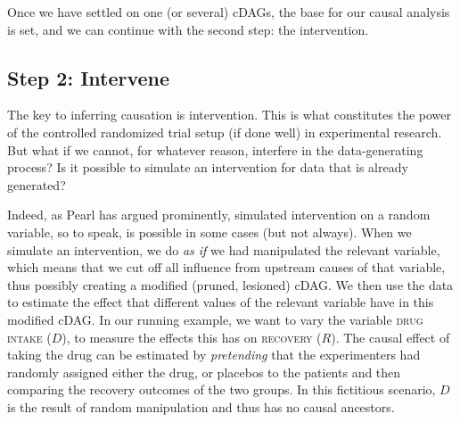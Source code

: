 \documentclass[nobib]{tufte-handout}
\begin{document}
Once we have settled on one (or several) cDAGs, the base for our causal analysis is set, and we can continue with the second step: the intervention.


\subsection{Step 2: Intervene} \label{sec:step2}

The key to inferring causation is intervention.
This is what constitutes the power of the controlled randomized trial setup (if done well) in experimental research.
But what if we cannot, for whatever reason, interfere in the data-generating process?
Is it possible to simulate an intervention for data that is already generated?


Indeed, as Pearl has argued prominently, simulated intervention on a random variable, so to speak, is possible in some cases (but not always). 
When we simulate an intervention, we do \textit{as if} we had manipulated the relevant variable, which means that we cut off all influence from upstream causes of that variable, thus possibly creating a modified (pruned, lesioned) cDAG.
We then use the data to estimate the effect that different values of the relevant variable have in this modified cDAG.
In our running example, we want to vary the variable \textsc{drug intake} ($D$), to measure the effects this has on \textsc{recovery} ($R$).
The causal effect of taking the drug can be estimated by \textit{pretending} that the experimenters had randomly assigned either the drug, or placebos to the patients and then comparing the recovery outcomes of the two groups. 
In this fictitious scenario, $D$ is the result of random manipulation and thus has no causal ancestors.
\end{document}

